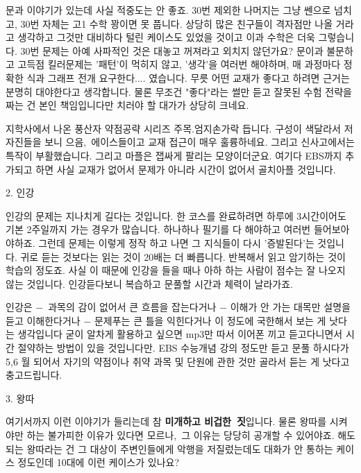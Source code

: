 문과 이야기가 있는데 사실 적중도는 안 좋죠. 30번 제외한 나머지는 그냥 쎈으로 넘치고, 30번 자체는 고1 수학 꽝이면 못 풉니다.
상당히 많은 친구들이 격자점만 나올 거라고 생각하고 그것만 대비하다 털린 케이스도 있었을 것이고
이과 수학은 더욱 그렇습니다. 30번 문제는 아예 사파적인 것은 대놓고 꺼져라고 외치지 않던가요?
문이과 불문하고 고득점 킬러문제는 '패턴'이 먹히지 않고, '생각'을 여러번 해야하며, 매 과정마다 정확한 식과 그래프 전개 요구한다.... 였습니다.
무릇 어떤 교재가 좋다고 하려면 근거는 분명히 대야한다고 생각합니다.
물론 무조건 "좋다"라는 썰만 듣고 잘못된 수험 전략을 짜는 건 본인 책임입니다만 치러야 할 대가가 상당히 크네요.
\vspace{5mm}

지학사에서 나온 풍산자 약점공략 시리즈 주목.엄지손가락 듭니다.
구성이 색달라서 저자진들을 보니 으음, 에이스들이고 교재 접근이 매우 훌륭하네요.
그리고 신사고에서는 특작이 부활했습니다.
그리고 마플은 잽싸게 팔리는 모양이더군요.
여기다 EBS까지 추가되고 하면 사실 교재가 없어서 문제가 아니라 시간이 없어서 골치아플 것입니다.
\vspace{5mm}

\item 2. 인강
\vspace{5mm}

인강의 문제는 지나치게 길다는 것입니다. 한 코스를 완료하려면 하루에 3시간이어도 기본 2주일까지 가는 경우가 많습니다.
하나하나 필기를 다 해야하고 여러번 들어보아야하죠.
그런데 문제는 이렇게 정작 하고 나면 그 지식들이 다시 '증발된다'는 것입니다.
귀로 듣는 것보다는 읽는 것이 20배는 더 빠릅니다. 반복해서 읽고 암기하는 것이 학습의 정도죠.
사실 이 때문에 인강을 들을 때나 아하 하는 사람이 점수는 잘 나오지 않는 것입니다. 인강듣다보니 복습하고 문풀할 시간과 체력이 날라가죠.
\vspace{5mm}

인강은
$-$ 과목의 감이 없어서 큰 흐름을 잡는다거나
$-$ 이해가 안 가는 대목만 설명을 듣고 이해한다거나
$-$ 문제푸는 큰 틀을 익힌다거나
이 정도에 국한해서 보는 게 낫다는 생각입니다
굳이 알차게 활용하고 싶으면 mp3만 따서 이어폰 끼고 듣고다니면서 시간 절약하는 방법이 있을 것입니다만.
EBS 수능개념 강의 정도만 듣고 문풀 하시다가 5,6 월 되어서 자기의 약점이나 취약 과목 및 단원에 관한 것만 골라서 듣는 게 낫다고 충고드립니다.
\vspace{5mm}

\item 3. 왕따
\vspace{5mm}

여기서까지 이런 이야기가 들리는데 참 \textbf{미개하고 비겁한 짓}입니다.
물론 왕따를 시켜야만 하는 불가피한 이유가 있다면 모르나, 그 이유는 당당히 공개할 수 있어야죠.
해도 되는 왕따라는 건 그 대상이 주변인들에게 악행을 저질렀는데도 대화가 안 통하는 케이스 정도인데 10대에 이런 케이스가 있나요?
\vspace{5mm}

